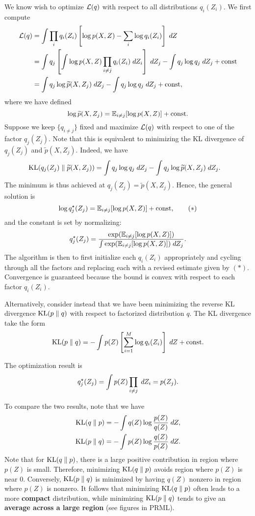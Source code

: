 \documentclass[a4paper]{article}
\begin{document}
We know wish to optimize $\mathcal{L}(q)$ with respect to all distributions
$q_i(Z_i)$. We first compute
\[
\begin{aligned}
\mathcal{L}(q)
&= \int \prod_i q_i(Z_i) \left[ \log p(X, Z) - \sum_i
\log q_i(Z_i) \right] \; d Z \\
&= \int q_j \left[ \int \log p(X, Z) \prod_{i \neq j}
q_i(Z_i) \; d Z_i \right] \; d Z_j
- \int q_j \log q_j \; d Z_j + \mathrm{const} \\
&= \int q_j \log \widetilde{p} (X, Z_j) \; d Z_j
- \int q_j \log q_j \; d Z_j + \mathrm{const},
\end{aligned}
\]
where we have defined
\[
\log \widetilde{p} (X, Z_j) = \mathbb{E}_{i \neq j}
[\log p(X, Z)] + \mathrm{const}.
\]
Suppose we keep $\{q_{i \neq j}\}$ fixed and maximize
$\mathcal{L}(q)$ with respect to one of the factor
$q_j(Z_j)$. Note that this is equivalent
to minimizing the KL divergence of $q_j(Z_j)$ and $\tilde{p}
(X, Z_j)$. Indeed, we have 
\[
\begin{aligned}
\mathrm{KL}(q_j (Z_j) \; \Vert \; \widetilde{p}(X, Z_j)) 
&= \int q_j \log q_j \; d Z_j 
- \int q_j \log \widetilde{p} (X, Z_j) \; d Z_j. 
\end{aligned}
\]
The minimum is thus achieved at $q_j(Z_j)
= \tilde{p} (X, Z_j)$. Hence, the general solution is
\begin{equation*}
  \log q_j^\star (Z_j) = \mathbb{E}_{i \neq j} [\log p(X, Z)] +
  \mathrm{const},
  \tag{$*$}
\end{equation*}
and the constant is set by normalizing:
\[
q^\star_j(Z_j)
= \frac{\exp (\mathbb{E}_{i \neq j} [\log p(X, Z)])}
{\int \exp (\mathbb{E}_{i \neq j} [\log p(X, Z)]) \; d Z_j}.
\]
The algorithm is then to first initialize each $q_i (Z_i)$
appropriately and cycling through all the factors and
replacing each with a revised estimate given by $(*)$.
Convergence is guaranteed because the bound is convex
with respect to each factor $q_i(Z_i)$.

Alternatively, consider instead that we have been minimizing 
the reverse KL divergence $\mathrm{KL}(p \; \Vert \; q)$ with respect to 
factorized distribution $q$. The KL divergence
take the form 
\[
\mathrm{KL}(p \; \Vert \; q) = - \int p(Z) \left[ \sum_{i=1}^M \log q_i 
(Z_i) \right] \; d Z + \mathrm{const}.
\]


The optimization result is 
\[
q_j^\star (Z_j) = \int p(Z) \prod_{i \neq j} \; d Z_i = p(Z_j).
\]

To compare the two results, note that we have 
\[
\begin{aligned}
\mathrm{KL}(q \; \Vert \; p) = - \int q(Z) \log \frac{p(Z)}{q(Z)} \; d Z, \\
\mathrm{KL}(p \; \Vert \; q) = - \int p(Z) \log \frac{q(Z)}{p(Z)} \; d Z.
\end{aligned}
\]
Note that for $\mathrm{KL}(q \; \Vert \; p)$, there is a large positive 
contribution in region where $p(Z)$ is small.
Therefore, minimizing $\mathrm{KL}(q \; \Vert \; p)$ avoids region 
where $p(Z)$ is near $0$. Conversely, 
$\mathrm{KL}(p \; \Vert \; q)$ is minimized by having $q(Z)$ nonzero 
in region where $p(Z)$ is nonzero. It follows that 
minimizing $\mathrm{KL}(q \; \Vert \; p)$ often leads to a more \textbf{compact} 
distribution, while minimizing $\mathrm{KL}(p \; \Vert \; q)$ tends 
to give an \textbf{average across a large region}
(see figures in PRML).
\end{document}
